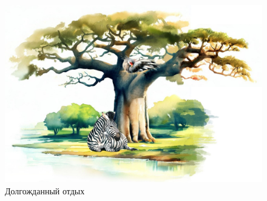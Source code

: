 \documentclass[a5paper,11pt]{memoir}
\begin{document}
\begin{figure}[h]
	\hspace{-1cm}\includegraphics[width=\paperwidth]{images/baobab-nap.jpeg}
	\caption{Долгожданный отдых}
\end{figure}


























\end{document}
